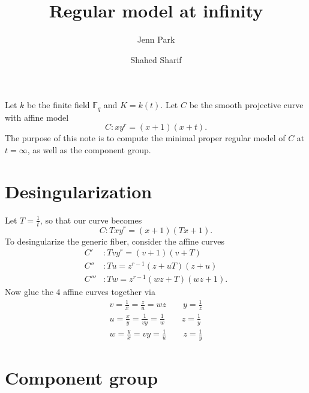 \documentclass{article}
\theoremstyle{plain}
\theoremstyle{definition}
\theoremstyle{remark}
\newcommand{\F}{\ensuremath{\mathbb{F}}}
\begin{document}
\title{Regular model at infinity}
\author{Jenn Park \and Shahed Sharif}
\maketitle

Let $k$ be the finite field $\F_q$ and $K = k(t)$. Let $C$ be the smooth projective curve with affine model 
\[
C: xy^r = (x+1)(x+t).
\]
The purpose of this note is to compute the minimal proper regular model of $C$ at $t = \infty$, as well as the component group.

\section{Desingularization}
\label{sec:desingularization}

Let $T = \frac{1}{t}$, so that our curve becomes
\[
C: Txy^r = (x+1)(Tx+1).
\]
To desingularize the generic fiber, consider the affine curves
\begin{align*}
  C'&: Tvy^r = (v+1)(v+T) \\
  C''&: Tu = z^{r-1}(z+uT)(z+u) \\
  C'''&: Tw = z^{r-1}(wz+T)(wz+1).
\end{align*}
Now glue the 4 affine curves together via
\begin{gather*}
  v = \frac{1}{x} = \frac{z}{u} = wz \qquad y = \frac{1}{z} \\
  u = \frac{x}{y} = \frac{1}{vy} = \frac{1}{w} \qquad  z = \frac{1}{y}\\
  w = \frac{y}{x} = vy = \frac{1}{u} \qquad z = \frac{1}{y}
\end{gather*}

\section{Component group}
\label{sec:component-group}




\end{document}
